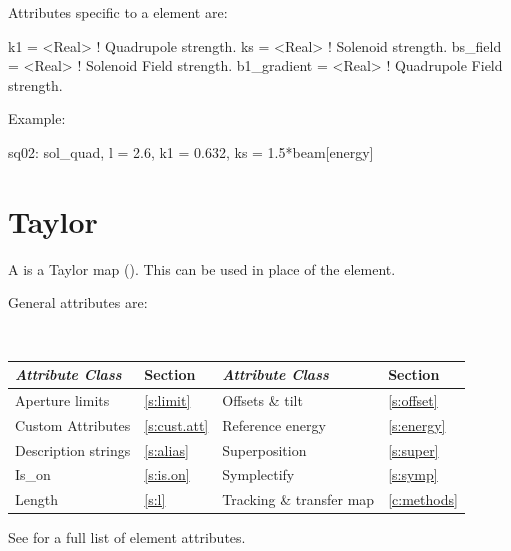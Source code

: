 {
Attributes specific to a  element are:
\begin{example}
  k1          = <Real>    ! Quadrupole strength.
  ks          = <Real>    ! Solenoid strength.
  bs_field    = <Real>    ! Solenoid Field strength.
  b1_gradient = <Real>    ! Quadrupole Field strength.
\end{example}

Example:
\begin{example}
  sq02: sol_quad, l = 2.6, k1 = 0.632, ks = 1.5*beam[energy]
\end{example}

\section{Taylor}
\label{s:taylor}

A  is a Taylor map (). This can be used
in place of the \mad {} element.

General  attributes are:
\begin{center} 
\tt
\begin{tabular}{llll} \toprule
  {\sl Attribute Class}      & Section          & {\sl Attribute Class}      & Section         \\ \midrule
  Aperture limits            & \ref{s:limit}    & Offsets \& tilt            & \ref{s:offset}  \\
  Custom Attributes          & \ref{s:cust.att} & Reference energy           & \ref{s:energy}  \\
  Description strings        & \ref{s:alias}    & Superposition              & \ref{s:super}   \\
  Is_on                      & \ref{s:is.on}    & Symplectify                & \ref{s:symp}    \\
  Length                     & \ref{s:l}        & Tracking \& transfer map   & \ref{c:methods} \\

  \bottomrule
\end{tabular}
\end{center}
\toffset
See  for a full list of element attributes.

}
